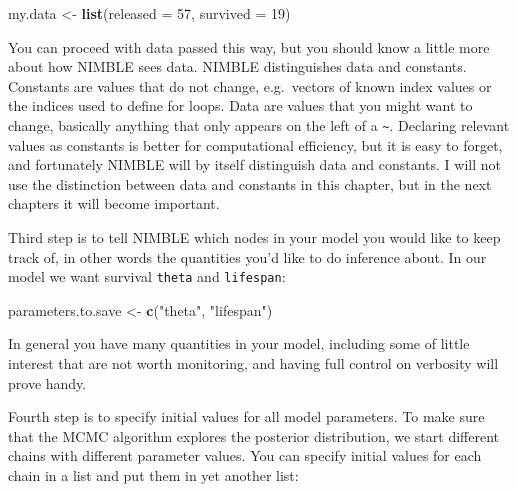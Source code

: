 \documentclass[
  12pt,
]{krantz}
\newenvironment{Shaded}{\begin{snugshade}}{\end{snugshade}}
\newcommand{\AttributeTok}[1]{\textcolor[rgb]{0.13,0.29,0.53}{#1}}
\newcommand{\DecValTok}[1]{\textcolor[rgb]{0.00,0.00,0.81}{#1}}
\newcommand{\FunctionTok}[1]{\textcolor[rgb]{0.13,0.29,0.53}{\textbf{#1}}}
\newcommand{\NormalTok}[1]{#1}
\newcommand{\OtherTok}[1]{\textcolor[rgb]{0.56,0.35,0.01}{#1}}
\newcommand{\StringTok}[1]{\textcolor[rgb]{0.31,0.60,0.02}{#1}}
\begin{document}
\begin{Shaded}
\begin{Highlighting}[]
\NormalTok{my.data }\OtherTok{\textless{}{-}} \FunctionTok{list}\NormalTok{(}\AttributeTok{released =} \DecValTok{57}\NormalTok{, }\AttributeTok{survived =} \DecValTok{19}\NormalTok{)}
\end{Highlighting}
\end{Shaded}

You can proceed with data passed this way, but you should know a little more about how NIMBLE sees data. NIMBLE distinguishes data and constants. Constants are values that do not change, e.g.~vectors of known index values or the indices used to define for loops. Data are values that you might want to change, basically anything that only appears on the left of a \texttt{\textasciitilde{}}. Declaring relevant values as constants is better for computational efficiency, but it is easy to forget, and fortunately NIMBLE will by itself distinguish data and constants. I will not use the distinction between data and constants in this chapter, but in the next chapters it will become important.

Third step is to tell NIMBLE which nodes in your model you would like to keep track of, in other words the quantities you'd like to do inference about. In our model we want survival \texttt{theta} and \texttt{lifespan}:

\begin{Shaded}
\begin{Highlighting}[]
\NormalTok{parameters.to.save }\OtherTok{\textless{}{-}} \FunctionTok{c}\NormalTok{(}\StringTok{"theta"}\NormalTok{, }\StringTok{"lifespan"}\NormalTok{)}
\end{Highlighting}
\end{Shaded}

In general you have many quantities in your model, including some of little interest that are not worth monitoring, and having full control on verbosity will prove handy.

Fourth step is to specify initial values for all model parameters. To make sure that the MCMC algorithm explores the posterior distribution, we start different chains with different parameter values. You can specify initial values for each chain in a list and put them in yet another list:
\end{document}
